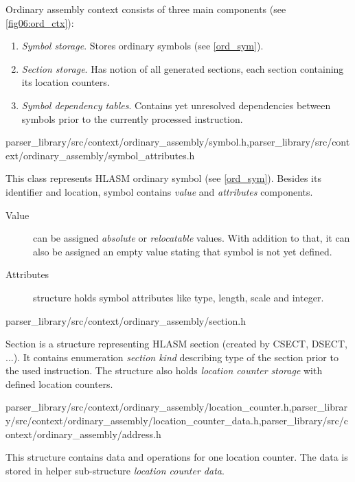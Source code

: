 Ordinary assembly context consists of three main components (see \cref{fig06:ord_ctx}):
\begin{enumerate}
	\item \emph{Symbol storage}. Stores ordinary symbols (see \cref{ord_sym}).
	\item \emph{Section storage}. Has notion of all generated sections, each section containing its location counters.
	\item \emph{Symbol dependency tables}. Contains yet unresolved dependencies between symbols prior to the currently processed instruction.
\end{enumerate}

{parser\_library/src/context/ordinary\_assembly/symbol.h,parser\_library/src/context/ordinary\_assembly/symbol\_attributes.h}

This class represents HLASM ordinary symbol (see \cref{ord_sym}). Besides its identifier and location, symbol contains \emph{value} and \emph{attributes} components.

\begin{description}
	\item[Value] can be assigned \emph{absolute} or \emph{relocatable} values. With addition to that, it can also be assigned an empty value stating that symbol is not yet defined.
	\item[Attributes] structure holds symbol attributes like type, length, scale and integer.
\end{description}

{parser\_library/src/context/ordinary\_assembly/section.h}

Section is a structure representing HLASM section (created by CSECT, DSECT, ...). It contains enumeration \emph{section kind} describing type of the section prior to the used instruction. The structure also holds \emph{location counter storage} with defined location counters.

{parser\_library/src/context/ordinary\_assembly/location\_counter.h,parser\_library/src/context/ordinary\_assembly/location\_counter\_data.h,parser\_library/src/context/ordinary\_assembly/address.h}

This structure contains data and operations for one location counter. The data is stored in helper sub-structure \emph{location counter data}.

